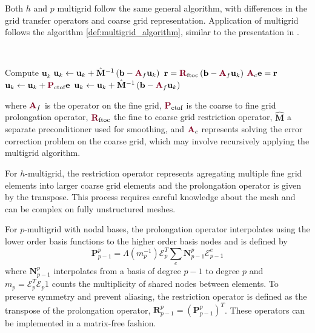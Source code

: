 Both $h$ and $p$ multigrid follow the same general algorithm, with differences in the grid transfer operators and coarse grid representation.
Application of multigrid follows the algorithm \ref{def:multigrid_algorithm}, similar to the presentation in \cite{brandt1982guide}.
\begin{definition}\label{def:multigrid_algorithm}
~\\
\begin{algorithmic}[1]
\State Compute $\mathbf{u}_k$
\State $\mathbf{u}_k \gets \mathbf{u}_k + \hat{\mathbf{M}}^{-1} \left( \mathbf{b} - {\color{burgundy}\mathbf{A}}_f \mathbf{u}_k \right)$ 
\State $\mathbf{r} = {\color{burgundy}\mathbf{R}}_{\text{ftoc}} \left( \mathbf{b} - {\color{burgundy}\mathbf{A}}_f \mathbf{u}_k \right)$ 
\State ${\color{burgundy}\mathbf{A}}_c \mathbf{e} = \mathbf{r}$                                                                          
\State $\mathbf{u}_k \gets \mathbf{u}_k + {\color{burgundy}\mathbf{P}}_{\text{ctof}} \mathbf{e}$                                         
\State $\mathbf{u}_k \gets \mathbf{u}_k + \hat{\mathbf{M}}^{-1} \left( \mathbf{b} - {\color{burgundy}\mathbf{A}}_f \mathbf{u}_k \right)$ 
\end{algorithmic}
\end{definition}
where ${\color{burgundy}\mathbf{A}}_f$ is the operator on the fine grid, ${\color{burgundy}\mathbf{P}}_{\text{ctof}}$ is the coarse to fine grid prolongation operator, ${\color{burgundy}\mathbf{R}}_{\text{ftoc}}$ the fine to coarse grid restriction operator, $\hat{\mathbf{M}}$ a separate preconditioner used for smoothing, and ${\color{burgundy}\mathbf{A}}_c$ represents solving the error correction problem on the coarse grid, which may involve recursively applying the multigrid algorithm.

For $h$-multigrid, the restriction operator represents agregating multiple fine grid elements into larger coarse grid elements and the prolongation operator is given by the transpose.
This process requires careful knowledge about the mesh and can be complex on fully unstructured meshes.

For $p$-multigrid with nodal bases, the prolongation operator interpolates using the lower order basis functions to the higher order basis nodes and is defined by
\begin{equation}
\mathbf{P}_{p - 1}^p = \Lambda \left( m_p^{-1} \right) \mathcal{E}_p^T \sum_e \mathbf{N}_{p - 1}^p \mathcal{E}^e_{p - 1}
\label{mg_prolong}
\end{equation}
where $\mathbf{N}_{p - 1}^p$ interpolates from a basis of degree $p - 1$ to degree $p$ and $m_p = \mathcal{E}_p^T \mathcal{E}_p 1$ counts the multiplicity of shared nodes between elements.
To preserve symmetry and prevent aliasing, the restriction operator is defined as the transpose of the prolongation operator, $\mathbf{R}_{p - 1}^p = \left( \mathbf{P}_{p - 1}^p \right)^T$.
These operators can be implemented in a matrix-free fashion.


